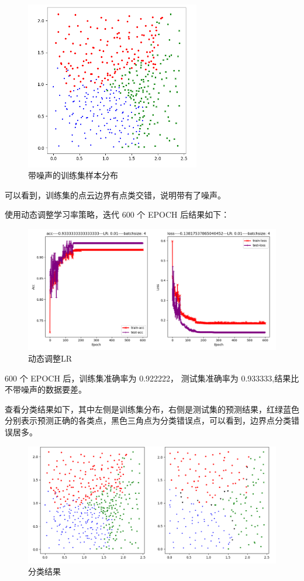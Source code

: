 \documentclass[12pt]{article}
\begin{document}
	\begin{figure}[H]
		\centering
		\includegraphics[width=3in]{./images/insects_noise_train_dist.png}
		\centering
		\caption{带噪声的训练集样本分布}
	\end{figure}
	
	可以看到，训练集的点云边界有点类交错，说明带有了噪声。
	
	使用动态调整学习率策略，迭代 600 个 EPOCH 后结果如下：
	
	\begin{figure}[H]
		\centering
		\includegraphics[width=5in]{./images/insects_noise_loss_step.png}
		\centering
		\caption{动态调整LR}
	\end{figure}
	
	600 个 EPOCH 后，训练集准确率为 0.922222， 测试集准确率为 0.933333,结果比不带噪声的数据要差。
	
	查看分类结果如下，其中左侧是训练集分布，右侧是测试集的预测结果，红绿蓝色分别表示预测正确的各类点，黑色三角点为分类错误点，可以看到，边界点分类错误居多。
	
	\begin{figure}[H]
		\centering
		\includegraphics[width=5.7in]{./images/insects_noise_result.png}
		\centering
		\caption{分类结果}
	\end{figure}
	
\end{document}

